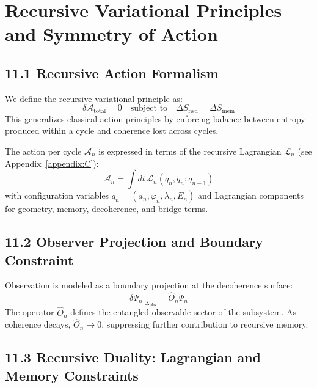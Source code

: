 \section{Recursive Variational Principles and Symmetry of Action}
\label{sec:recursive-variational-symmetry}

\subsection{11.1 Recursive Action Formalism}

We define the recursive variational principle as:
\begin{equation}
\delta \mathcal{A}_{\text{total}} = 0 \quad \text{subject to} \quad \Delta S_{\text{fwd}} = \Delta S_{\text{mem}}
\end{equation}
This generalizes classical action principles by enforcing balance between entropy produced within a cycle and coherence lost across cycles.

The action per cycle \( \mathcal{A}_n \) is expressed in terms of the recursive Lagrangian \( \mathcal{L}_n \) (see Appendix~\ref{appendix:C}):
\begin{equation}
\mathcal{A}_n = \int dt \, \mathcal{L}_n(q_n, \dot{q}_n; q_{n-1})
\end{equation}
with configuration variables \( q_n = (a_n, \varphi_n, \lambda_n, E_n) \) and Lagrangian components for geometry, memory, decoherence, and bridge terms.

\subsection{11.2 Observer Projection and Boundary Constraint}

Observation is modeled as a boundary projection at the decoherence surface:
\begin{equation}
\delta \Psi_n \big|_{\Sigma_{\text{obs}}} = \hat{O}_n \Psi_n
\end{equation}
The operator \( \hat{O}_n \) defines the entangled observable sector of the subsystem. As coherence decays, \( \hat{O}_n \to 0 \), suppressing further contribution to recursive memory.

\subsection{11.3 Recursive Duality: Lagrangian and Memory Constraints}

